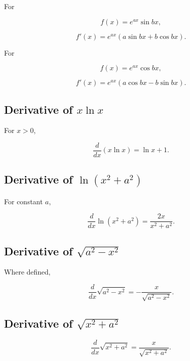 For

\[
f(x)
=
e^{ax}\sin bx,
\]

\[
\boxed{
f'(x)
=
e^{ax}
(a\sin bx+b\cos bx).
}
\]

For

\[
f(x)
=
e^{ax}\cos bx,
\]

\[
\boxed{
f'(x)
=
e^{ax}
(a\cos bx-b\sin bx).
}
\]

\subsection{Derivative of \(x\ln x\)}
\label{subsec:x-log-x-derivative}

For \(x>0\),

\[
\boxed{
\frac{d}{dx}
(x\ln x)
=
\ln x+1.
}
\]

\subsection{Derivative of \(\ln(x^2+a^2)\)}
\label{subsec:log-square-plus-constant-derivative}

For constant \(a\),

\[
\boxed{
\frac{d}{dx}
\ln(x^2+a^2)
=
\frac{
2x
}{
x^2+a^2
}.
}
\]

\subsection{Derivative of \(\sqrt{a^2-x^2}\)}
\label{subsec:sqrt-a2-minus-x2-derivative}

Where defined,

\[
\boxed{
\frac{d}{dx}
\sqrt{a^2-x^2}
=
-\frac{
x
}{
\sqrt{a^2-x^2}
}.
}
\]

\subsection{Derivative of \(\sqrt{x^2+a^2}\)}
\label{subsec:sqrt-x2-plus-a2-derivative}

\[
\boxed{
\frac{d}{dx}
\sqrt{x^2+a^2}
=
\frac{
x
}{
\sqrt{x^2+a^2}
}.
}
\]

